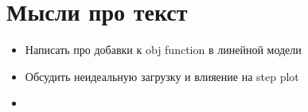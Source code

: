 
\section*{Мысли про текст}


\begin{itemize}
	\item Написать про добавки к obj function в линейной модели
	\item Обсудить неидеальную загрузку и влияение на step plot
	\item 
\end{itemize}